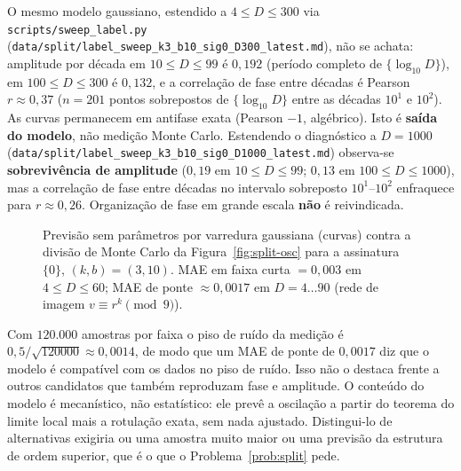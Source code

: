\documentclass[11pt]{article}
\theoremstyle{definition}
\theoremstyle{remark}
\begin{document}
O mesmo modelo gaussiano, estendido a $4 \le D \le 300$ via \texttt{scripts/sweep\_label.py} (\texttt{data/split/label\_sweep\_k3\_b10\_sig0\_D300\_latest.md}), não se achata: amplitude por década em $10 \le D \le 99$ é $0{,}192$ (período completo de $\{\log_{10} D\}$), em $100 \le D \le 300$ é $0{,}132$, e a correlação de fase entre décadas é Pearson $r \approx 0{,}37$ ($n=201$ pontos sobrepostos de $\{\log_{10} D\}$ entre as décadas $10^1$ e $10^2$). As curvas permanecem em antifase exata (Pearson $-1$, algébrico). Isto é \textbf{saída do modelo}, não medição Monte Carlo. Estendendo o diagnóstico a $D=1000$ (\texttt{data/split/label\_sweep\_k3\_b10\_sig0\_D1000\_latest.md}) observa-se \textbf{sobrevivência de amplitude} ($0{,}19$ em $10 \le D \le 99$; $0{,}13$ em $100 \le D \le 1000$), mas a correlação de fase entre décadas no intervalo sobreposto $10^1$--$10^2$ enfraquece para $r \approx 0{,}26$. Organização de fase em grande escala \textbf{não} é reivindicada.

\begin{figure}[htbp]
\centering

\caption{Previsão sem parâmetros por varredura gaussiana (curvas) contra a divisão de Monte Carlo da Figura~\ref{fig:split-osc} para a assinatura $\{0\}$, $(k,b)=(3,10)$. MAE em faixa curta $= 0{,}003$ em $4 \le D \le 60$; MAE de ponte $\approx 0{,}0017$ em $D=4\ldots 90$ (rede de imagem $v \equiv r^k \pmod 9$).}
\label{fig:split-predict}
\end{figure}

Com $120.000$ amostras por faixa o piso de ruído da medição é $0{,}5/\sqrt{120000} \approx 0{,}0014$, de modo que um MAE de ponte de $0{,}0017$ diz que o modelo é compatível com os dados no piso de ruído. Isso não o destaca frente a outros candidatos que também reproduzam fase e amplitude. O conteúdo do modelo é mecanístico, não estatístico: ele prevê a oscilação a partir do teorema do limite local mais a rotulação exata, sem nada ajustado. Distingui-lo de alternativas exigiria ou uma amostra muito maior ou uma previsão da estrutura de ordem superior, que é o que o Problema~\ref{prob:split} pede.
\end{document}
